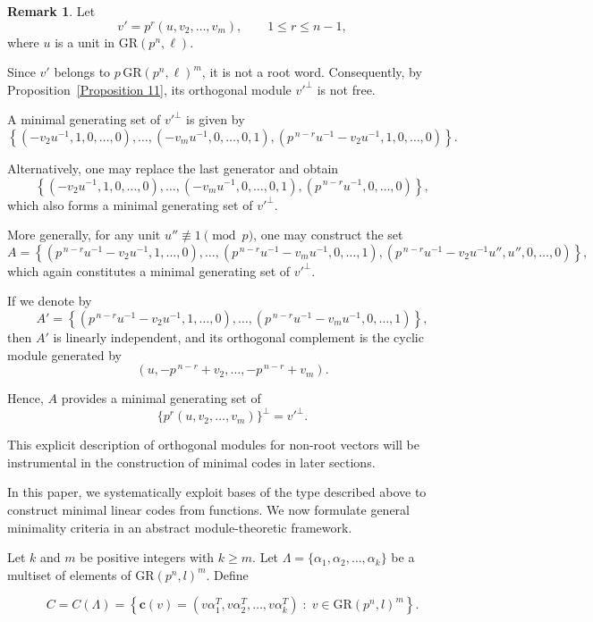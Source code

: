 \documentclass[10pt]{article}
\theoremstyle{definition}
\newtheorem{remark}[lem]{Remark}
\begin{document}
\begin{remark}\label{Remark 12}
Let
\[
v' = p^{r}(u,v_2,\dots,v_m),
\qquad 1 \le r \le n-1,
\]
where $u$ is a unit in $\mathrm{GR}(p^{n},\ell)$.

Since $v'$ belongs to $p\,\mathrm{GR}(p^{n},\ell)^m$,
it is not a root word.
Consequently, by Proposition~\ref{Proposition 11},
its orthogonal module $v'^{\perp}$ is not free.

A minimal generating set of $v'^{\perp}$ is given by
\[
\left\{
(-v_2u^{-1},1,0,\dots,0),\dots,
(-v_mu^{-1},0,\dots,0,1),
(p^{\,n-r}u^{-1}-v_2u^{-1},1,0,\dots,0)
\right\}.
\]

Alternatively, one may replace the last generator and obtain
\[
\left\{
(-v_2u^{-1},1,0,\dots,0),\dots,
(-v_mu^{-1},0,\dots,0,1),
(p^{\,n-r}u^{-1},0,\dots,0)
\right\},
\]
which also forms a minimal generating set of $v'^{\perp}$.

More generally, for any unit $u'' \not\equiv 1 \pmod p$,
one may construct the set
\[
A=
\left\{
(p^{\,n-r}u^{-1}-v_2u^{-1},1,\dots,0),
\dots,
(p^{\,n-r}u^{-1}-v_mu^{-1},0,\dots,1),
(p^{\,n-r}u^{-1}-v_2u^{-1}u'',u'',0,\dots,0)
\right\},
\]
which again constitutes a minimal generating set of $v'^{\perp}$.

If we denote by
\[
A'=
\left\{
(p^{\,n-r}u^{-1}-v_2u^{-1},1,\dots,0),
\dots,
(p^{\,n-r}u^{-1}-v_mu^{-1},0,\dots,1)
\right\},
\]
then $A'$ is linearly independent, and its orthogonal complement
is the cyclic module generated by
\[
(u,-p^{\,n-r}+v_2,\dots,-p^{\,n-r}+v_m).
\]

Hence, $A$ provides a minimal generating set of
\[
\{p^{r}(u,v_2,\dots,v_m)\}^{\perp}
=
v'^{\perp}.
\]

This explicit description of orthogonal modules
for non-root vectors will be instrumental in the construction
of minimal codes in later sections.
\end{remark}

\medskip

In this paper, we systematically exploit bases of the type described above
to construct minimal linear codes from functions.
We now formulate general minimality criteria
in an abstract module-theoretic framework.

\medskip

Let $k$ and $m$ be positive integers with $k \ge m$.
Let $\Lambda = \{\alpha_1, \alpha_2, \ldots, \alpha_k\}$
be a multiset of elements of $\mathrm{GR}(p^n,l)^m$.
Define

\[
C = C(\Lambda)
= \left\{
\mathbf{c}(v)
=
(v\alpha_1^T, v\alpha_2^T, \ldots, v\alpha_k^T)
\; : \;
v \in \mathrm{GR}(p^n,l)^m
\right\}.
\]
\end{document}

